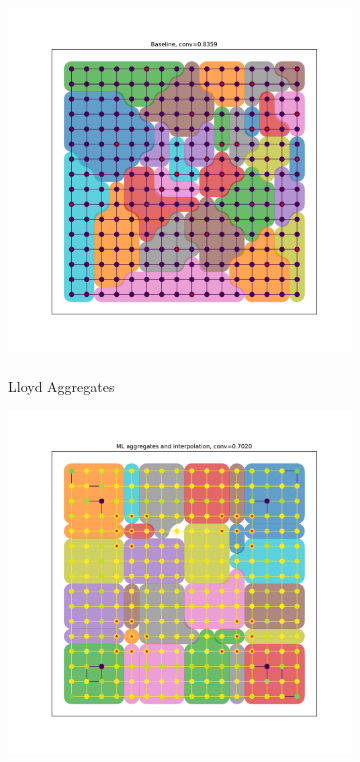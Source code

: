 \documentclass{article}
\begin{document}
\begin{figure}[b]
  \centering
  \begin{subfigure}[b]{\textwidth}
    \centering
    \includegraphics[height=4in]{isotropic_lloyd.pdf}
    \caption{Lloyd Aggregates}
  \end{subfigure}
  \hfill
  \begin{subfigure}[b]{0.49\textwidth}
    \centering
    \includegraphics[width=\textwidth]{isotropic_full.pdf}

\end{subfigure}
\end{figure}
\end{document}

